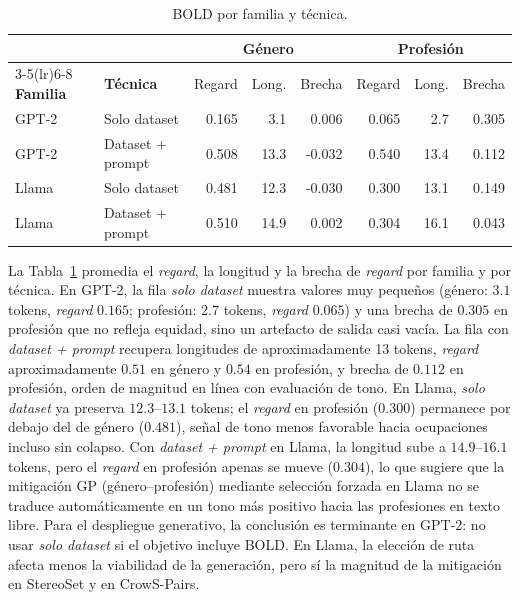 \documentclass[12pt,a4paper]{report}
\newcommand{\GP}{GP (género--profesión)}
\begin{document}
\begin{table}[H]
\centering\small
\caption{BOLD por familia y técnica.}
\label{tab:gp_bold}
\begin{tabular}{@{}ll rrr rrr@{}}
\toprule
& & \multicolumn{3}{c}{\textbf{Género}} & \multicolumn{3}{c}{\textbf{Profesión}} \\
\cmidrule(lr){3-5}\cmidrule(lr){6-8}
\textbf{Familia} & \textbf{Técnica} & Regard & Long. & Brecha & Regard & Long. & Brecha \\
\midrule
GPT-2 & Solo dataset & 0.165 & 3.1 & 0.006 & 0.065 & 2.7 & 0.305 \\
GPT-2 & Dataset + prompt & 0.508 & 13.3 & -0.032 & 0.540 & 13.4 & 0.112 \\
Llama & Solo dataset & 0.481 & 12.3 & -0.030 & 0.300 & 13.1 & 0.149 \\
Llama & Dataset + prompt & 0.510 & 14.9 & 0.002 & 0.304 & 16.1 & 0.043 \\
\bottomrule
\end{tabular}
\end{table}
La Tabla~\ref{tab:gp_bold} promedia el \textit{regard}, la longitud y la brecha de \textit{regard} por familia y por técnica. En GPT-2, la fila \textit{solo dataset} muestra valores muy pequeños (género: $3.1$ tokens, \textit{regard} $0.165$; profesión: $2.7$ tokens, \textit{regard} $0.065$) y una brecha de $0.305$ en profesión que no refleja equidad, sino un artefacto de salida casi vacía. La fila con \textit{dataset + prompt} recupera longitudes de aproximadamente 13 tokens, \textit{regard} aproximadamente $0.51$ en género y $0.54$ en profesión, y brecha de $0.112$ en profesión, orden de magnitud en línea con evaluación de tono. En Llama, \textit{solo dataset} ya preserva $12.3$--$13.1$ tokens; el \textit{regard} en profesión ($0.300$) permanece por debajo del de género ($0.481$), señal de tono menos favorable hacia ocupaciones incluso sin colapso. Con \textit{dataset + prompt} en Llama, la longitud sube a $14.9$--$16.1$ tokens, pero el \textit{regard} en profesión apenas se mueve ($0.304$), lo que sugiere que la mitigación \GP{} mediante selección forzada en Llama no se traduce automáticamente en un tono más positivo hacia las profesiones en texto libre. Para el despliegue generativo, la conclusión es terminante en GPT-2: no usar \textit{solo dataset} si el objetivo incluye BOLD. En Llama, la elección de ruta afecta menos la viabilidad de la generación, pero sí la magnitud de la mitigación en StereoSet y en CrowS-Pairs.
\end{document}
